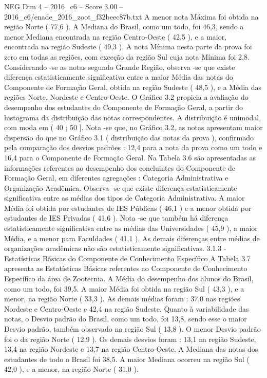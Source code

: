 \begin{textsample}{NEG Dim 4 – 2016\_c6 – Score 3.00 – 2016\_c6/enade\_2016\_zoot\_f32beec87b.txt}
A menor nota Máxima foi obtida na região Norte ( 77,6 ).
A Mediana do Brasil, como um todo, foi 46,3, sendo a menor Mediana encontrada na região Centro-Oeste ( 42,5 ), e a maior, encontrada na região Sudeste ( 49,3 ).
A nota Mínima nesta parte da prova foi zero em todas as regiões, com exceção da região Sul cuja nota Mínima foi 2,8.
Considerando -se as notas segundo Grande Região, observa -se que existe diferença estatisticamente significativa entre a maior Média das notas do Componente de Formação Geral, obtida na região Sudeste ( 48,5 ), e a Média das regiões Norte, Nordeste e Centro-Oeste.
O Gráfico 3.2 propicia a avaliação do desempenho dos estudantes do Componente de Formação Geral, a partir do histograma da distribuição das notas correspondentes.
A distribuição é unimodal, com moda em ( 40 ; 50 ].
Nota -se que, no Gráfico 3.2, as notas apresentam maior dispersão do que no Gráfico 3.1 ( distribuição das notas da prova ), confirmado pela comparação dos desvios padrões : 12,4 para a nota da prova como um todo e 16,4 para o Componente de Formação Geral.
Na Tabela 3.6 são apresentadas as informações referentes ao desempenho dos concluintes do Componente de Formação Geral, em diferentes agregações : Categoria Administrativa e Organização Acadêmica.
Observa -se que existe diferença estatisticamente significativa entre as médias dos tipos de Categoria Administrativa.
A maior Média foi obtida por estudantes de IES Públicas ( 46,1 ) e a menor obtida por estudantes de IES Privadas ( 41,6 ).
Nota -se que também há diferença estatisticamente significativa entre as médias das Universidades ( 45,9 ), a maior Média, e a menor para Faculdades ( 41,1 ).
As demais diferenças entre médias de organizações acadêmicas não são estatisticamente significativas. 3.1.3 - Estatísticas Básicas do Componente de Conhecimento Específico A Tabela 3.7 apresenta as Estatísticas Básicas referentes ao Componente de Conhecimento Específico da área de Zootecnia.
A Média do desempenho dos alunos do Brasil, como um todo, foi 39,5.
A maior Média foi obtida na região Sul ( 43,3 ), e a menor, na região Norte ( 33,3 ).
As demais médias foram : 37,0 nas regiões Nordeste e Centro-Oeste e 42,4 na região Sudeste.
Quanto à variabilidade das notas, o Desvio padrão do Brasil, como um todo, foi 13,8, sendo esse o maior Desvio padrão, também observado na região Sul ( 13,8 ).
O menor Desvio padrão foi o da região Norte ( 12,9 ).
Os demais desvios foram : 13,1 na região Sudeste, 13,4 na região Nordeste e 13,7 na região Centro-Oeste.
A Mediana das notas dos estudantes de todo o Brasil foi 38,5.
A maior Mediana ocorreu na região Sul ( 42,0 ), e a menor, na região Norte ( 31,0 ).

\end{textsample}
